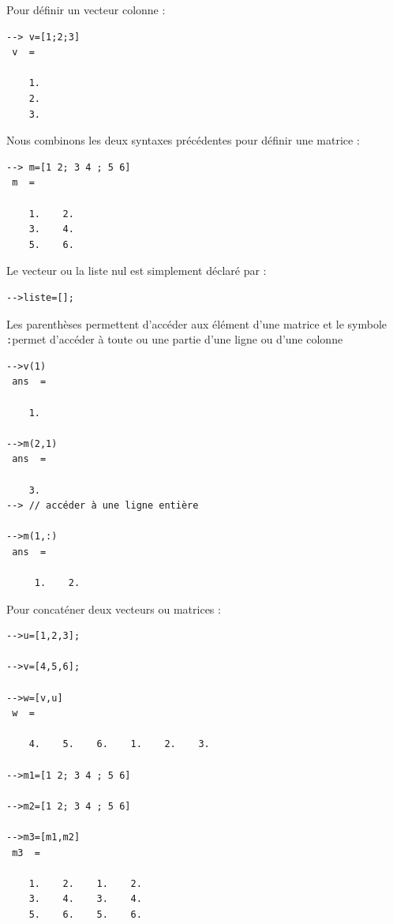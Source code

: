 Pour définir un vecteur colonne :
\begin{code}
\begin{verbatim}
--> v=[1;2;3]
 v  =
 
    1.    
    2.
    3. 
\end{verbatim}
\end{code}

Nous combinons les deux syntaxes précédentes pour définir une matrice : 
\begin{code}
\begin{verbatim}
--> m=[1 2; 3 4 ; 5 6]
 m  =
 
    1.    2.  
    3.    4.  
    5.    6.  
\end{verbatim}
\end{code}

Le vecteur ou la liste nul est simplement déclaré par :
\begin{code}
\begin{verbatim}
-->liste=[];
\end{verbatim}
\end{code}

Les parenthèses permettent d'accéder aux élément d'une matrice et le 
symbole \og\verb?:?\fg permet d'accéder à toute ou une partie d'une 
ligne ou d'une colonne
\begin{code}
\begin{verbatim}
-->v(1)
 ans  =
 
    1.  

-->m(2,1)
 ans  =
 
    3.  
--> // accéder à une ligne entière
 
-->m(1,:)
 ans  =
   
     1.    2. 
\end{verbatim}
\end{code}

Pour concaténer deux vecteurs ou matrices :
\begin{code}
\begin{verbatim}
-->u=[1,2,3];
 
-->v=[4,5,6];
 
-->w=[v,u]
 w  =
 
    4.    5.    6.    1.    2.    3.

-->m1=[1 2; 3 4 ; 5 6]
 
-->m2=[1 2; 3 4 ; 5 6]
 
-->m3=[m1,m2]
 m3  =
 
    1.    2.    1.    2.  
    3.    4.    3.    4.  
    5.    6.    5.    6. 
\end{verbatim}
\end{code}
